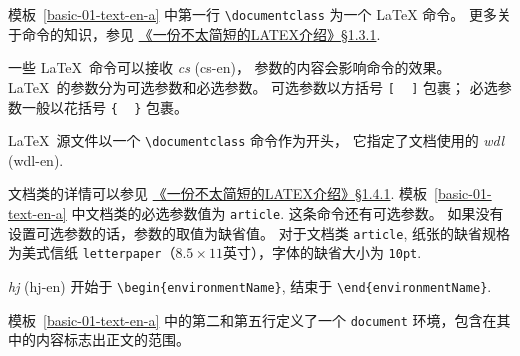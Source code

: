 \documentclass[
    11pt,
    base=hide,
    cite=authoryear,
    device=phone,
    lang=cn,
    mode=simple,
    result=answer,
    toc=onecol,
]{elegantbook_sierxue}
\begin{document}
模板~\ref{basic-01-text-en-a} 中第一行 \lstinline{\documentclass} 为一个
{\LaTeX} 命令。
\noindent 更多关于命令的知识，参见
\hyperlink{books/lshort-zh-cn.pdf.16}%
{《一份不太简短的LATEX介绍》\S1.3.1}.

\begin{latex}\label{tex:arguments}
    一些 \LaTeX\ 命令可以接收 \emph{\gls{cs}} (\gls{cs-en})，
    参数的内容会影响命令的效果。
    \LaTeX\ 的参数分为可选参数和必选参数。
    可选参数以方括号 \texttt[ ~ \texttt] 包裹；
    必选参数一般以花括号 \texttt\{ ~ \texttt\} 包裹。
\end{latex}

\begin{latex}\label{tex:documentclass}
    \LaTeX\ 源文件以一个 \lstinline{\documentclass} 命令作为开头，
    它指定了文档使用的 \emph{\gls{wdl}} (\gls{wdl-en}).
\end{latex}

文档类的详情可以参见 \hyperlink{books/lshort-zh-cn.pdf.17}%
{《一份不太简短的LATEX介绍》\S1.4.1}.
模板~\ref{basic-01-text-en-a} 中文档类的必选参数值为 \lstinline{article}.
这条命令还有可选参数。
如果没有设置可选参数的话，参数的取值为缺省值。
对于文档类 \texttt{article}, 纸张的缺省规格为美式信纸
\texttt{letterpaper}（\(8.5\times11\)英寸），字体的缺省大小为 \texttt{10pt}.

\begin{latex}\label{tex:environment}
    \emph{\gls{hj}} (\gls{hj-en}) 开始于
    \lstinline|\begin{environmentName}|,
    结束于 \lstinline|\end{environmentName}|.
\end{latex}
模板~\ref{basic-01-text-en-a} 中的第二和第五行定义了一个 \texttt{document}
环境，包含在其中的内容标志出正文的范围。
\end{document}
